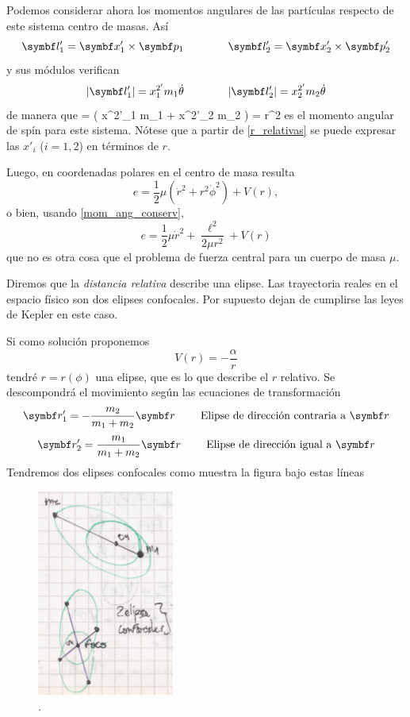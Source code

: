 \documentclass[10pt,oneside]{CBFT_book}
\begin{document}
Podemos considerar ahora los momentos angulares de las partículas respecto de este sistema centro
de masas. Así
\[
	\vb{l}_1' = \vb{x}_1' \times \vb{p}_1 \qquad \qquad  \vb{l}_2' = \vb{x}_2' \times \vb{p}_2'
\]
y sus módulos verifican 
\[
	|\vb{l}_1'| = {x}^{2'}_1 m_1 \dot{\theta} \qquad \qquad  |\vb{l}_2'| = {x}^{2'}_2 m_2 \dot{\theta}
\]
de manera que 
\be
	\ell = ( {x}^{2'}_1 m_1 + {x}^{2'}_2 m_2 ) \dot{\theta} = \mu r^2 \dot{\theta}
	\label{mom_ang_conserv}
\ee
es el momento angular de spín para este sistema. Nótese que a partir de \eqref{r_relativas} se puede
expresar las $x'_i$ ($i=1,2$) en términos de $r$.

Luego, en coordenadas polares en el centro de masa resulta
\[
	e = \frac{1}{2} \mu ( \dot{ r}^2 + r^2\dot{\phi}^2 ) + V(r),
\]
o bien, usando \eqref{mom_ang_conserv},
\[
	e = \frac{1}{2} \mu \dot{ r}^2 + \frac{\ell^2}{2 \mu r^2 } + V(r)
\]
que no es otra cosa que el problema de fuerza central para un cuerpo de masa $\mu$.

Diremos que la {\it distancia relativa} describe una elipse. Las trayectoria reales en el espacio físico
son dos elipses confocales. Por supuesto dejan de cumplirse las leyes de Kepler en este caso.

Si como solución proponemos
\[
	V(r) = -\frac{\alpha}{r}
\]
tendré $ r = r(\phi) $ una elipse, que es lo que describe el $ r $ relativo.
Se descompondrá el movimiento según las ecuaciones de transformación
\[
	\vb{r}_1'= -\frac{m_2}{m_1+m_2} \vb{r} \qquad \text{ Elipse de dirección contraria a $\vb{r}$}
\]
\[
	\vb{r}_2'= \frac{m_1}{m_1+m_2} \vb{r} \qquad \text{ Elipse de dirección igual a $\vb{r}$}	
\]
Tendremos dos elipses confocales como muestra la figura bajo estas líneas 

\begin{figure}[hbt]
	\begin{center}
	\includegraphics[width=0.4\textwidth]{images/fig_mc_elipses_confocales.pdf}	 
	\end{center}
	\caption{.}
	\label{fig_mc_elipses_confocales}
\end{figure} 
\end{document}

